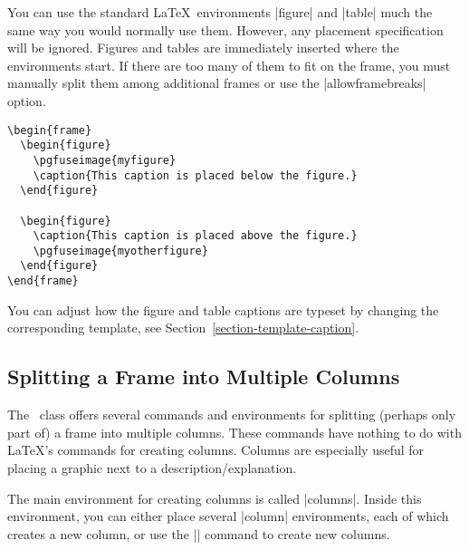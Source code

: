 You can use the standard \LaTeX\ environments |figure| and
|table| much the same way you would normally use them. However,
any placement specification will be ignored. Figures and tables are
immediately inserted where the environments start. If there are too
many of them to fit on the frame, you must manually split them among
additional frames or use the |allowframebreaks| option.

\example
\begin{verbatim}
\begin{frame}
  \begin{figure}
    \pgfuseimage{myfigure}
    \caption{This caption is placed below the figure.}
  \end{figure}

  \begin{figure}
    \caption{This caption is placed above the figure.}
    \pgfuseimage{myotherfigure}
  \end{figure}
\end{frame}
\end{verbatim}

You can adjust how the figure and table captions are typeset by
changing the corresponding template, see
Section~\ref{section-template-caption}. 





\subsection{Splitting a Frame into Multiple Columns}

The \beamer\ class offers several commands and environments for
splitting (perhaps only part of) a frame into multiple columns. These
commands have nothing to do with \LaTeX's commands for creating
columns. Columns are especially useful for placing a graphic next to a
description/explanation.

The main environment for creating columns is called |columns|. Inside
this environment, you can either place several |column| environments,
each of which creates a new column, or use the |\column| command to
create new columns.

